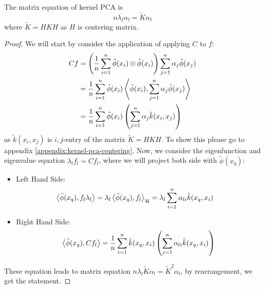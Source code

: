 \begin{proposition}
    The matrix equation of kernel PCA is 
    \begin{equation*}
        n\lambda_l\alpha_l = \tilde{K}\alpha_l
    \end{equation*}
    where $\tilde{K} = HKH$ as $H$ is centering matrix.
\end{proposition}
\begin{proof}
    We will start by consider the application of applying $C$ to $f$:
    \begin{equation*}
    \begin{aligned}
        Cf &= \left( \frac{1}{n}\sum^n_{i=1}\tilde{\phi}(x_i)\otimes\tilde{\phi}(x_i) \right)\sum_{j=1}^n\alpha_j\tilde{\phi}(x_j) \\
        &= \frac{1}{n}\sum^n_{i=1}\tilde{\phi}(x_i)\left\langle \tilde{\phi}(x_i), \sum_{j=1}^n\alpha_j\tilde{\phi}(x_j) \right\rangle \\
        &= \frac{1}{n}\sum^n_{i=1}\tilde{\phi}(x_i)\left( \sum^n_{j=1}\alpha_j \tilde{k}(x_i, x_j) \right)
    \end{aligned}
    \end{equation*}
    as $\tilde{k}(x_i, x_j)$ is $i,j$-entry of the matrix $\tilde{K}=HKH$. To show this please go to appendix \ref{appendix:kernel-pca-centering}. Now, we consider the eigenfunction and eigenvalue equation $\lambda_l f_l = Cf_l$, where we will project both side with $\tilde{\phi}(x_q)$:
    \begin{itemize}
        \item Left Hand Side:
        \begin{equation*}
        \begin{aligned}
            \left\langle \tilde{\phi}(x_q), f_l\lambda_l \right\rangle &= \lambda_l\left\langle \tilde{\phi}(x_q), f_l \right\rangle_\mathcal{H} = \lambda_l \sum^n_{i=1}\alpha_{li}\tilde{k}(x_q, x_i)
        \end{aligned}
        \end{equation*}
        \item Right Hand Side:
        \begin{equation*}
            \left\langle \tilde{\phi}(x_q), Cf_l \right\rangle = \frac{1}{n}\sum^n_{i=1}\tilde{k}(x_q, x_i) \left( \sum^n_{j=1}\alpha_{li}\tilde{k}(x_q, x_i) \right)
        \end{equation*}
    \end{itemize}
    These equation leads to matrix equation $n\lambda_l\tilde{K}\alpha_l = \tilde{K}^2\alpha_l$, by rearrangement, we get the statement. 
\end{proof}

